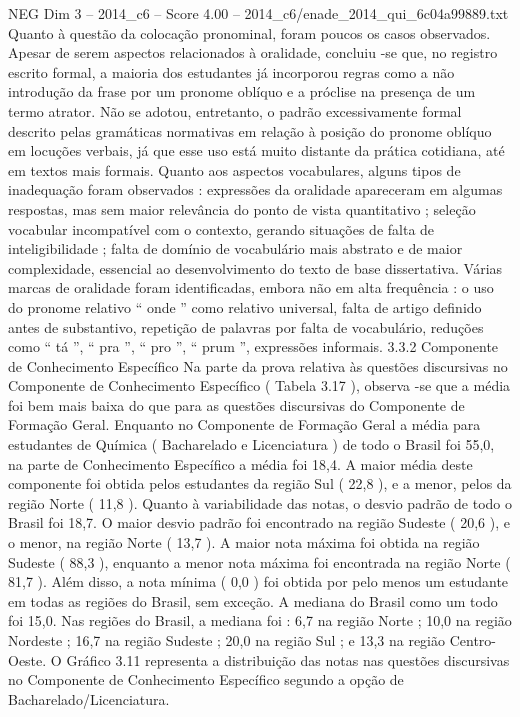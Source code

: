 \begin{textsample}{NEG Dim 3 – 2014\_c6 – Score 4.00 – 2014\_c6/enade\_2014\_qui\_6c04a99889.txt}
Quanto à questão da colocação pronominal, foram poucos os casos observados.
Apesar de serem aspectos relacionados à oralidade, concluiu -se que, no registro escrito formal, a maioria dos estudantes já incorporou regras como a não introdução da frase por um pronome oblíquo e a próclise na presença de um termo atrator.
Não se adotou, entretanto, o padrão excessivamente formal descrito pelas gramáticas normativas em relação à posição do pronome oblíquo em locuções verbais, já que esse uso está muito distante da prática cotidiana, até em textos mais formais.
Quanto aos aspectos vocabulares, alguns tipos de inadequação foram observados : expressões da oralidade apareceram em algumas respostas, mas sem maior relevância do ponto de vista quantitativo ; seleção vocabular incompatível com o contexto, gerando situações de falta de inteligibilidade ; falta de domínio de vocabulário mais abstrato e de maior complexidade, essencial ao desenvolvimento do texto de base dissertativa.
Várias marcas de oralidade foram identificadas, embora não em alta frequência : o uso do pronome relativo “ onde ” como relativo universal, falta de artigo definido antes de substantivo, repetição de palavras por falta de vocabulário, reduções como “ tá ”, “ pra ”, “ pro ”, “ prum ”, expressões informais. 3.3.2 Componente de Conhecimento Específico Na parte da prova relativa às questões discursivas no Componente de Conhecimento Específico ( Tabela 3.17 ), observa -se que a média foi bem mais baixa do que para as questões discursivas do Componente de Formação Geral.
Enquanto no Componente de Formação Geral a média para estudantes de Química ( Bacharelado e Licenciatura ) de todo o Brasil foi 55,0, na parte de Conhecimento Específico a média foi 18,4.
A maior média deste componente foi obtida pelos estudantes da região Sul ( 22,8 ), e a menor, pelos da região Norte ( 11,8 ).
Quanto à variabilidade das notas, o desvio padrão de todo o Brasil foi 18,7.
O maior desvio padrão foi encontrado na região Sudeste ( 20,6 ), e o menor, na região Norte ( 13,7 ).
A maior nota máxima foi obtida na região Sudeste ( 88,3 ), enquanto a menor nota máxima foi encontrada na região Norte ( 81,7 ).
Além disso, a nota mínima ( 0,0 ) foi obtida por pelo menos um estudante em todas as regiões do Brasil, sem exceção.
A mediana do Brasil como um todo foi 15,0.
Nas regiões do Brasil, a mediana foi : 6,7 na região Norte ; 10,0 na região Nordeste ; 16,7 na região Sudeste ; 20,0 na região Sul ; e 13,3 na região Centro-Oeste.
O Gráfico 3.11 representa a distribuição das notas nas questões discursivas no Componente de Conhecimento Específico segundo a opção de Bacharelado/Licenciatura.

\end{textsample}
